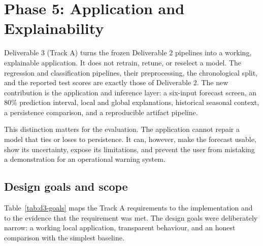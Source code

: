 
\section{Phase 5: Application and Explainability}
\label{sec:phase5}

Deliverable 3 (Track A) turns the frozen Deliverable 2 pipelines into a
working, explainable application. It does not retrain, retune, or reselect a
model. The regression and classification pipelines, their preprocessing, the
chronological split, and the reported test scores are exactly those of
Deliverable 2. The new contribution is the application and inference layer:
a six-input forecast screen, an 80\% prediction interval, local and global
explanations, historical seasonal context, a persistence comparison, and a
reproducible artifact pipeline.

This distinction matters for the evaluation. The application cannot repair a
model that ties or loses to persistence. It can, however, make the forecast
usable, show its uncertainty, expose its limitations, and prevent the user from
mistaking a demonstration for an operational warning system.

\subsection{Design goals and scope}
\label{sec:d3-goals}

Table~\ref{tab:d3-goals} maps the Track A requirements to the implementation and
to the evidence that the requirement was met. The design goals were deliberately
narrow: a working local application, transparent behaviour, and an honest
comparison with the simplest baseline.

